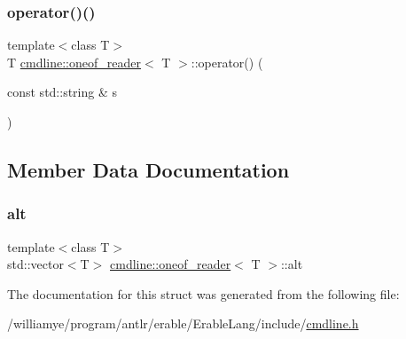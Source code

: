 \mbox{\label{structcmdline_1_1oneof__reader_a08342ad57fe7eae76ccdbe6af6cc572f}} 
\subsubsection{\texorpdfstring{operator()()}{operator()()}}
{\footnotesize\ttfamily template$<$class T$>$ \\
T \mbox{\hyperlink{structcmdline_1_1oneof__reader}{cmdline\+::oneof\+\_\+reader}}$<$ T $>$\+::operator() (\begin{DoxyParamCaption}\item[{const std\+::string \&}]{s }\end{DoxyParamCaption})\hspace{0.3cm}{\ttfamily [inline]}}



\subsection{Member Data Documentation}
\mbox{\label{structcmdline_1_1oneof__reader_a78106c3bc54537d6ae591d0b04eab7a5}} 
\subsubsection{\texorpdfstring{alt}{alt}}
{\footnotesize\ttfamily template$<$class T$>$ \\
std\+::vector$<$T$>$ \mbox{\hyperlink{structcmdline_1_1oneof__reader}{cmdline\+::oneof\+\_\+reader}}$<$ T $>$\+::alt\hspace{0.3cm}{\ttfamily [private]}}



The documentation for this struct was generated from the following file\+:\begin{DoxyCompactItemize}
\item 
/williamye/program/antlr/erable/\+Erable\+Lang/include/\mbox{\hyperlink{cmdline_8h}{cmdline.\+h}}\end{DoxyCompactItemize}
